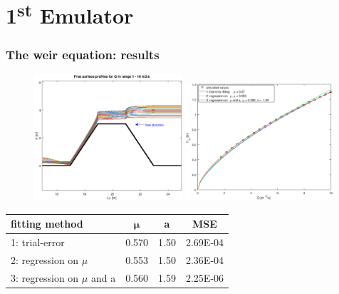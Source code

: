 \documentclass[xcolor=dvipsnames, USenglish]{beamer}  %
\begin{document}
\section{1\textsuperscript{st} Emulator}
  \begin{frame}

    \frametitle{The weir equation: results}
    \begin{figure}[t]
      \includegraphics[width=0.49\textwidth]{img/free_surfaces.eps}
      \includegraphics[width=0.49\textwidth]{img/points_interpolations.eps}
    \end{figure}

    \begin{table}
    \centering
       \begin{tabular}{lccc}
       \toprule
       \textbf{fitting method} & $\boldsymbol{\mu}$ &  \textbf{a} & \textbf{MSE}\\
       \midrule
       1: trial-error & 0.570 & 1.50 & 2.69E-04\\
       2: regression on $\mu$ & 0.553 & 1.50 & 2.36E-04\\
       3: regression on $\mu$ and a & 0.560 & 1.59 & 2.25E-06\\
       \bottomrule
       \end{tabular}
    \end{table}

  \end{frame}

\end{document}

